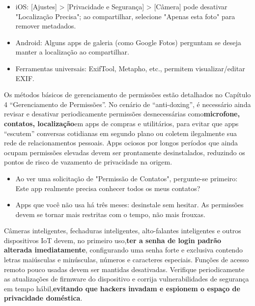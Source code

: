 \begin{itemize}
  \item iOS: [Ajustes] > [Privacidade e Segurança] > [Câmera] pode desativar "Localização Precisa"; ao compartilhar, selecione "Apenas esta foto" para remover metadados.
  \item Android: Alguns apps de galeria (como Google Fotos) perguntam se deseja manter a localização ao compartilhar.
  \item Ferramentas universais: ExifTool, Metapho, etc., permitem visualizar/editar EXIF.
\end{itemize}


Os métodos básicos de gerenciamento de permissões estão detalhados no Capítulo 4 “Gerenciamento de Permissões”. No cenário de “anti-doxing”, é necessário ainda revisar e desativar periodicamente permissões desnecessárias como\textbf{microfone, contatos, localização}em apps de compras e utilitários, para evitar que apps “escutem” conversas cotidianas em segundo plano ou coletem ilegalmente sua rede de relacionamentos pessoais. Apps ociosos por longos períodos que ainda ocupam permissões elevadas devem ser prontamente desinstalados, reduzindo os pontos de risco de vazamento de privacidade na origem.

\begin{itemize}
  \item Ao ver uma solicitação de "Permissão de Contatos", pergunte-se primeiro: Este app realmente precisa conhecer todos os meus contatos?
  \item Apps que você não usa há três meses: desinstale sem hesitar. As permissões devem se tornar mais restritas com o tempo, não mais frouxas.
\end{itemize}


Câmeras inteligentes, fechaduras inteligentes, alto-falantes inteligentes e outros dispositivos IoT devem, no primeiro uso,\textbf{ter a senha de login padrão alterada imediatamente}, configurando uma senha forte e exclusiva contendo letras maiúsculas e minúsculas, números e caracteres especiais. Funções de acesso remoto pouco usadas devem ser mantidas desativadas. Verifique periodicamente as atualizações de firmware do dispositivo e corrija vulnerabilidades de segurança em tempo hábil,\textbf{evitando que hackers invadam e espionem o espaço de privacidade doméstica}.

